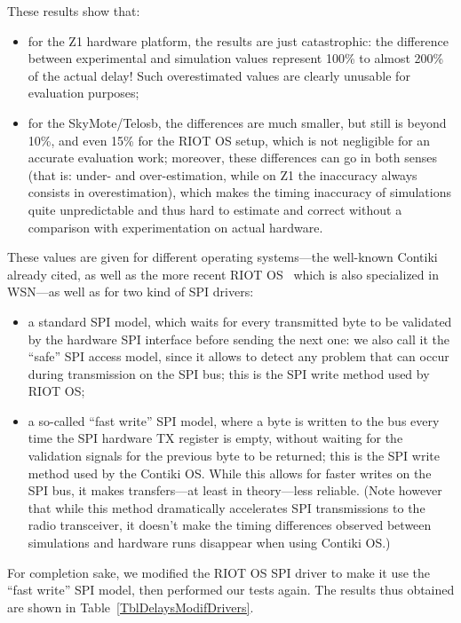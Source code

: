\documentclass[a4paper,10pt]{article}
\begin{document}
\medskip

These results show that:
\begin{itemize}
\item for the Z1 hardware platform, the results are just catastrophic:
the difference between experimental and simulation values represent
100\% to almost 200\% of the actual delay! Such overestimated values
are clearly unusable for evaluation purposes;
\item for the SkyMote/Telosb, the differences are much smaller, but still
is beyond 10\%, and even 15\% for the RIOT OS setup, which is not negligible
for an accurate evaluation work; moreover, these differences can go in
both senses (that is: under- and over-estimation, while on Z1 the inaccuracy
always consists in overestimation), which makes the timing inaccuracy of
simulations quite unpredictable and thus hard to estimate and correct
without a comparison with experimentation on actual hardware.
\end{itemize}

These values are given for different operating systems---the well-known
Contiki already cited, as well as the more recent RIOT OS~\cite{RIOT}
which is also specialized in WSN---as well as for two kind of SPI drivers:
\begin{itemize}
\item a standard SPI model, which waits for every transmitted byte to be
validated by the hardware SPI interface before sending the next one:
we also call it the ``safe'' SPI access model, since it allows to detect
any problem that can occur during transmission on the SPI bus; this is
the SPI write method used by RIOT OS;
\item a so-called ``fast write'' SPI model, where a byte is written to
the bus every time the SPI hardware TX register is empty, without waiting
for the validation signals for the previous byte to be returned; this is
the SPI write method used by the Contiki OS. While this allows for faster
writes on the SPI bus, it makes transfers---at least in theory---less
reliable. (Note however that while this method dramatically accelerates
SPI transmissions to the radio transceiver, it doesn't make the timing
differences observed between simulations and hardware runs disappear
when using Contiki OS.)
\end{itemize}

For completion sake, we modified the RIOT OS SPI driver to make it use
the ``fast write'' SPI model, then performed our tests again. The results
thus obtained are shown in Table~\ref{TblDelaysModifDrivers}.
\end{document}
